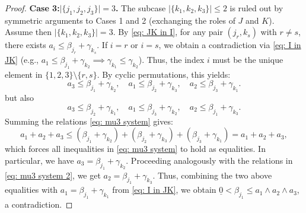 \documentclass[10pt,a4paper]{amsart}
\begin{document}
\begin{proof}
\medskip
\noindent\textbf{Case 3:$\lvert\{ j_1,j_2,j_3\}\rvert=3$.}
The subcase $\lvert\{k_1,k_2,k_3\}\rvert \le 2$ is ruled out by symmetric arguments to Cases 1 and 2 (exchanging the roles of $J$ and $K$). Assume then $\lvert\{k_1,k_2,k_3\}\rvert = 3$. By \ref{eq: JK in I}, for any pair $(j_r, k_s)$ with $r \neq s$, there exists $a_i \le \beta_{j_r} + \gamma_{k_s}$. If $i=r$ or $i=s$, we obtain a contradiction via \ref{eq: I in JK} (e.g., $a_1 \le \beta_{j_1}+\gamma_{k_2} \implies \gamma_{k_1} \le \gamma_{k_2}$). 
Thus, the index $i$ must be the unique element in $\{1,2,3\} \setminus \{r,s\}$. By cyclic permutations, this yields:
\begin{equation}\label{eq: mu3 system}
    a_3 \le \beta_{j_1}+\gamma_{k_2}, \quad a_1 \le \beta_{j_2}+\gamma_{k_3}, \quad a_2 \le \beta_{j_3}+\gamma_{k_1}.
\end{equation}
but also
\begin{equation}\label{eq: mu3 system 2}
    a_3 \le \beta_{j_2}+\gamma_{k_1}, \quad a_1 \le \beta_{j_3}+\gamma_{k_2}, \quad a_2 \le \beta_{j_1}+\gamma_{k_3}.
\end{equation}
Summing the relations \eqref{eq: mu3 system} gives:
\[
    a_1+a_2+a_3 \le (\beta_{j_1}+\gamma_{k_2}) + (\beta_{j_2}+\gamma_{k_3}) + (\beta_{j_3}+\gamma_{k_1}) = a_1+a_2+a_3,
\]
which forces all inequalities in \eqref{eq: mu3 system} to hold as equalities. In particular, we have $a_3 = \beta_{j_1}+\gamma_{k_2}$. Proceeding analogously with the relations in \eqref{eq: mu3 system 2}, we get $a_2 = \beta_{j_1}+\gamma_{k_3}$. Thus, combining the two above equalities with $a_1 = \beta_{j_1}+\gamma_{k_1}$ from \ref{eq: I in JK}, we obtain $\underline{0} < \beta_{j_1} \le a_1 \wedge a_2 \wedge a_3$, a contradiction.


\end{proof}
\end{document}
